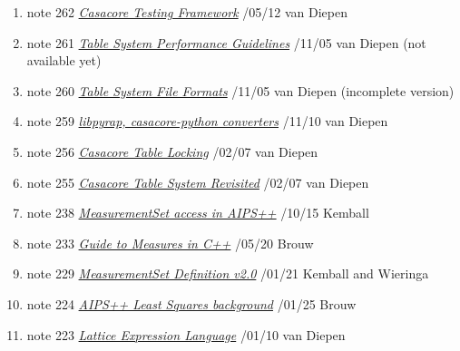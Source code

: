 %

\begin{enumerate}

\item
note 262
\href{262.html}{\textit{Casacore Testing Framework}}
/05/12 van Diepen

\item
note 261
\href{261.html}{\textit{Table System Performance Guidelines}}
/11/05 van Diepen (not available yet)

\item
note 260
\href{260.html}{\textit{Table System File Formats}}
/11/05 van Diepen (incomplete version)

\item
note 259
\href{259.html}{\textit{libpyrap, casacore-python converters}}
/11/10 van Diepen

\item
note 256
\href{256.html}{\textit{Casacore Table Locking}}
/02/07 van Diepen

\item
note 255
\href{255.html}{\textit{Casacore Table System Revisited}}
/02/07 van Diepen

\item
note 238
\href{238.html}{\textit{MeasurementSet access in AIPS++}}
/10/15 Kemball

\item
note 233
\href{233.html}{\textit{Guide to Measures in C++}}
/05/20 Brouw

\item
note 229
\href{229.html}{\textit{MeasurementSet Definition v2.0}}
/01/21 Kemball and Wieringa

\item
note 224
\href{224.html}{\textit{AIPS++ Least Squares background}}
/01/25 Brouw

\item
note 223
\href{223.html}{\textit{Lattice Expression Language}}
/01/10 van Diepen


\end{enumerate}

